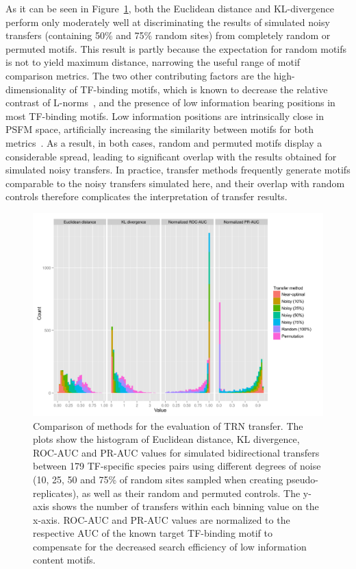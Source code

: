 As it can be seen in Figure~\ref{fig:transfer-evaluation-comparison}, both the
Euclidean distance and KL-divergence perform only moderately well at
discriminating the results of simulated noisy transfers (containing 50\% and
75\% random sites) from completely random or permuted motifs. This result is
partly because the expectation for random motifs is not to yield maximum
distance, narrowing the useful range of motif comparison metrics. The two other
contributing factors are the high-dimensionality of TF-binding motifs, which is
known to decrease the relative contrast of
L-norms~\cite{aggarwal2001surprising}, and the presence of low information
bearing positions in most TF-binding motifs. Low information positions are
intrinsically close in PSFM space, artificially increasing the similarity
between motifs for both metrics~\cite{zhang2013spic}. As a result, in both
cases, random and permuted motifs display a considerable spread, leading to
significant overlap with the results obtained for simulated noisy transfers. In
practice, transfer methods frequently generate motifs comparable to the noisy
transfers simulated here, and their overlap with random controls therefore
complicates the interpretation of transfer results.

\begin{figure}
  \centering
  \includegraphics[width=\textwidth]{figures/chapter3/transfer-evaluation-comparison}
  \caption{Comparison of methods for the evaluation of TRN transfer. The plots
    show the histogram of Euclidean distance, KL divergence, ROC-AUC and PR-AUC
    values for simulated bidirectional transfers between 179 TF-specific
    species pairs using different degrees of noise (10, 25, 50 and 75\% of
    random sites sampled when creating pseudo-replicates), as well as their
    random and permuted controls. The y-axis shows the number of transfers
    within each binning value on the x-axis. ROC-AUC and PR-AUC values are
    normalized to the respective AUC of the known target TF-binding motif to
    compensate for the decreased search efficiency of low information content
    motifs.}
\label{fig:transfer-evaluation-comparison}
\end{figure}

